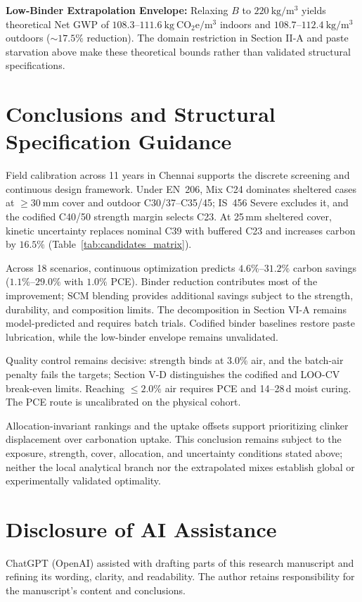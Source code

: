 \documentclass[journal]{IEEEtran}
\begin{document}
\noindent\textbf{Low-Binder Extrapolation Envelope:} Relaxing $B$ to $220\ \mathrm{kg/m^3}$ yields theoretical Net GWP of $108.3\text{--}111.6\ \mathrm{kg\ CO_2e/m^3}$ indoors and $108.7\text{--}112.4\ \mathrm{kg/m^3}$ outdoors ($\sim17.5\%$ reduction). The domain restriction in Section II-A and paste starvation above make these theoretical bounds rather than validated structural specifications.


\section{Conclusions and Structural Specification Guidance}
Field calibration across 11 years in Chennai supports the discrete screening and continuous design framework. Under EN~206, Mix C24 dominates sheltered cases at $\ge30\ \mathrm{mm}$ cover and outdoor C30/37--C35/45; IS~456 Severe excludes it, and the codified C40/50 strength margin selects C23. At 25\,mm sheltered cover, kinetic uncertainty replaces nominal C39 with buffered C23 and increases carbon by $16.5\%$ (Table~\ref{tab:candidates_matrix}).

Across 18 scenarios, continuous optimization predicts $4.6\%\text{--}31.2\%$ carbon savings ($1.1\%\text{--}29.0\%$ with $1.0\%$ PCE). Binder reduction contributes most of the improvement; SCM blending provides additional savings subject to the strength, durability, and composition limits. The decomposition in Section VI-A remains model-predicted and requires batch trials. Codified binder baselines restore paste lubrication, while the low-binder envelope remains unvalidated.

Quality control remains decisive: strength binds at $3.0\%$ air, and the batch-air penalty fails the targets; Section V-D distinguishes the codified and LOO-CV break-even limits. Reaching $\le2.0\%$ air requires PCE and 14--28\,d moist curing. The PCE route is uncalibrated on the physical cohort.

Allocation-invariant rankings and the uptake offsets support prioritizing clinker displacement over carbonation uptake. This conclusion remains subject to the exposure, strength, cover, allocation, and uncertainty conditions stated above; neither the local analytical branch nor the extrapolated mixes establish global or experimentally validated optimality.

\section*{Disclosure of AI Assistance}
ChatGPT (OpenAI) assisted with drafting parts of this research manuscript and refining its wording, clarity, and readability. The author retains responsibility for the manuscript's content and conclusions.
\end{document}
